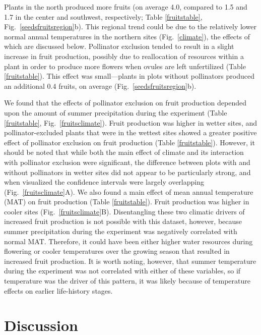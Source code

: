 \documentclass{article}
\begin{document}
Plants in the north produced more fruits (on average 4.0, compared to 1.5 and 1.7 in the center and southwest, respectively; Table \ref{fruitstable}, Fig.\ \ref{seedsfruitsregion}b). This regional trend could be due to the relatively lower normal annual temperatures in the northern sites (Fig.\ \ref{climate}), the effects of which are discussed below. Pollinator exclusion tended to result in a slight increase in fruit production, possibly due to reallocation of resources within a plant in order to produce more flowers when ovules are left unfertilized (Table \ref{fruitstable}). This effect was small---plants in plots without pollinators produced an additional 0.4 fruits, on average (Fig.\ \ref{seedsfruitsregion}b). 

We found that the effects of pollinator exclusion on fruit production depended upon the amount of summer precipitation during the experiment (Table \ref{fruitstable}, Fig.\ \ref{fruitsclimate}). Fruit production was higher in wetter sites, and pollinator-excluded plants that were in the wettest sites showed a greater positive effect of pollinator exclusion on fruit production (Table \ref{fruitstable}). However, it should be noted that while both the main effect of climate and its interaction with pollinator exclusion were significant, the difference between plots with and without pollinators in wetter sites did not appear to be particularly strong, and when visualized the confidence intervals were largely overlapping (Fig.\ \ref{fruitsclimate}A). We also found a main effect of mean annual temperature (MAT) on fruit production (Table \ref{fruitstable}). Fruit production was higher in cooler sites (Fig.\ \ref{fruitsclimate}B). Disentangling these two climatic drivers of increased fruit production is not possible with this dataset, however, because summer precipitation during the experiment was negatively correlated with normal MAT. Therefore, it could have been either higher water resources during flowering or cooler temperatures over the growing season that resulted in increased fruit production. It is worth noting, however, that summer temperature during the experiment was not correlated with either of these variables, so if temperature was the driver of this pattern, it was likely because of temperature effects on earlier life-history stages. 

\section*{Discussion}
\end{document}
